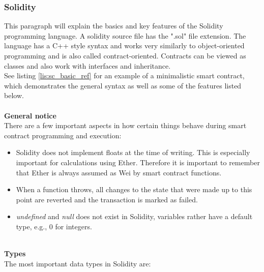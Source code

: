 \subsubsection{Solidity}
This paragraph will explain the basics and key features of the Solidity programming language.
A solidity source file has the ".sol" file extension.
The language has a C++ style syntax and works very similarly to object-oriented programming and is also called contract-oriented\cite{doc-oriented}.
Contracts can be viewed as classes and also work with interfaces and inheritance.
\\
See listing \ref{lis:sc_basic_ref} for an example of a minimalistic smart contract, which demonstrates the general syntax as well as some of the features listed below.
\\\\
\textbf{General notice}\\
There are a few important aspects in how certain things behave during smart contract programming and execution:
\begin{itemize}
  \item Solidity does not implement floats at the time of writing.
  This is especially important for calculations using Ether.
  Therefore it is important to remember that Ether is always assumed as Wei by smart contract functions.
  \item When a function throws, all changes to the state that were made up to this point are reverted and the transaction is marked as failed.
  \item \textit{undefined} and \textit{null} does not exist in Solidity, variables rather have a default type, e.g., 0 for integers\cite{doc-types}.
\end{itemize}
\leavevmode
\\
\textbf{Types}\\
The most important data types in Solidity are\cite{doc-types}:
